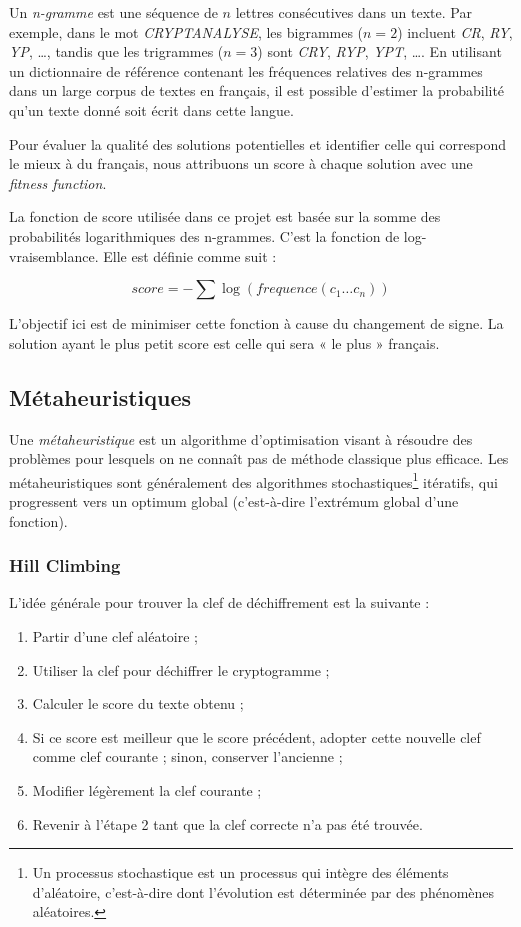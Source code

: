 \documentclass[a4paper]{article}
\begin{document}
Un \textit{n-gramme} est une séquence de $n$ lettres consécutives dans un texte. Par exemple, dans le mot \textit{CRYPTANALYSE}, les bigrammes ($n=2$) incluent \textit{CR}, \textit{RY}, \textit{YP}, \ldots, tandis que les trigrammes ($n=3$) sont \textit{CRY}, \textit{RYP}, \textit{YPT}, \ldots.  
En utilisant un dictionnaire de référence contenant les fréquences relatives des n-grammes dans un large corpus de textes en français, il est possible d’estimer la probabilité qu’un texte donné soit écrit dans cette langue.

Pour évaluer la qualité des solutions potentielles et identifier celle qui correspond le mieux à du français, nous attribuons un score à chaque solution avec une \textit{fitness function}.

La fonction de score utilisée dans ce projet est basée sur la somme des probabilités logarithmiques des n-grammes. C’est la fonction de log-vraisemblance. Elle est définie comme suit :

\[
score = - \sum \log(frequence(c_1 \ldots c_n))
\]

L’objectif ici est de minimiser cette fonction à cause du changement de signe. La solution ayant le plus petit score est celle qui sera « le plus » français.

\subsection{Métaheuristiques}

Une \textit{métaheuristique} est un algorithme d’optimisation visant à résoudre des problèmes pour lesquels on ne connaît pas de méthode classique plus efficace.  
Les métaheuristiques sont généralement des algorithmes stochastiques\footnote{Un processus stochastique est un processus qui intègre des éléments d’aléatoire, c’est-à-dire dont l’évolution est déterminée par des phénomènes aléatoires.} itératifs, qui progressent vers un optimum global (c’est-à-dire l’extrémum global d’une fonction).

\subsubsection{Hill Climbing}

L’idée générale pour trouver la clef de déchiffrement est la suivante :
\begin{enumerate}
    \item Partir d’une clef aléatoire ;
    \item Utiliser la clef pour déchiffrer le cryptogramme ;
    \item Calculer le score du texte obtenu ;
    \item Si ce score est meilleur que le score précédent, adopter cette nouvelle clef comme clef courante ; sinon, conserver l’ancienne ;
    \item Modifier légèrement la clef courante ;
    \item Revenir à l’étape 2 tant que la clef correcte n’a pas été trouvée.
\end{enumerate}
\end{document}
